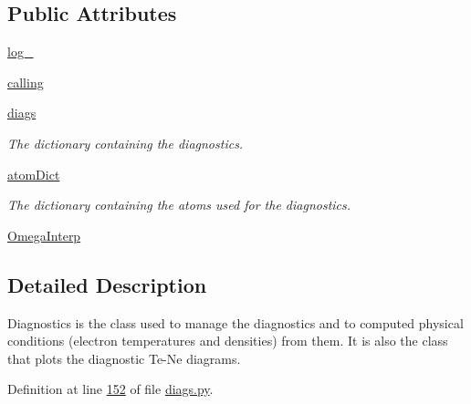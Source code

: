 \subsection*{Public Attributes}
\begin{DoxyCompactItemize}
\item 
\hyperlink{classpyneb_1_1core_1_1diags_1_1_diagnostics_a20b70abfa1fd458af2b797e06da01ed0}{log\-\_\-}
\item 
\hyperlink{classpyneb_1_1core_1_1diags_1_1_diagnostics_a07dce673fec8b2383ef411ab94b0b2fe}{calling}
\item 
\hyperlink{classpyneb_1_1core_1_1diags_1_1_diagnostics_a0c0f7e36097677f61a6a14a0c3127b02}{diags}
\begin{DoxyCompactList}\small\item\em The dictionary containing the diagnostics. \end{DoxyCompactList}\item 
\hyperlink{classpyneb_1_1core_1_1diags_1_1_diagnostics_a36301f268745b33abe6cfeb3e41a6356}{atom\-Dict}
\begin{DoxyCompactList}\small\item\em The dictionary containing the atoms used for the diagnostics. \end{DoxyCompactList}\item 
\hyperlink{classpyneb_1_1core_1_1diags_1_1_diagnostics_acfd0638b293790832bcee3cd9f3ec342}{Omega\-Interp}
\end{DoxyCompactItemize}


\subsection{Detailed Description}
\begin{DoxyVerb}Diagnostics is the class used to manage the diagnostics and to computed physical conditions 
    (electron temperatures and densities) from them. 
It is also the class that plots the diagnostic Te-Ne diagrams.\end{DoxyVerb}
 

Definition at line \hyperlink{diags_8py_source_l00152}{152} of file \hyperlink{diags_8py_source}{diags.\-py}.



